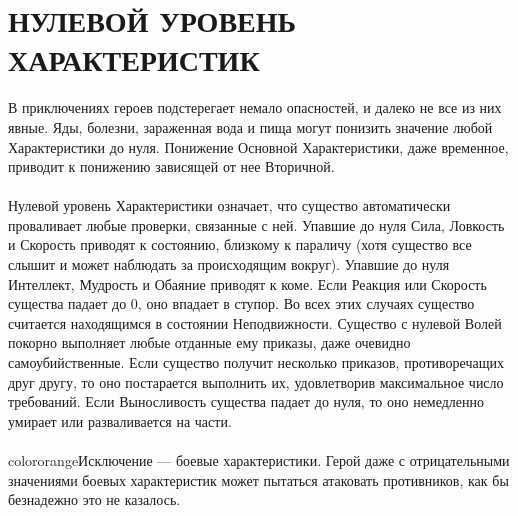 \section{НУЛЕВОЙ УРОВЕНЬ ХАРАКТЕРИСТИК}
В приключениях героев подстерегает немало опасностей, и далеко не все из них явные. Яды, болезни, зараженная вода и пища могут понизить значение любой Характеристики до нуля. Понижение Основной Характеристики, даже временное, приводит к понижению зависящей от нее Вторичной.
\paragraph{}
Нулевой уровень Характеристики означает, что существо автоматически проваливает любые проверки, связанные с ней. Упавшие до нуля Сила, Ловкость и Скорость приводят к состоянию, близкому к параличу (хотя существо все слышит и может наблюдать за происходящим вокруг). Упавшие до нуля Интеллект, Мудрость и Обаяние приводят к коме. Если Реакция или Скорость существа падает до 0, оно впадает в ступор. Во всех этих случаях существо считается находящимся в состоянии Неподвижности. Существо с нулевой Волей покорно выполняет любые отданные ему приказы, даже очевидно самоубийственные. Если существо получит несколько приказов, противоречащих друг другу, то оно постарается выполнить их, удовлетворив максимальное число требований. Если Выносливость существа падает до нуля, то оно немедленно умирает или разваливается на части.
\paragraph{}
{color{orange}Исключение — боевые характеристики. Герой даже с отрицательными значениями боевых характеристик может пытаться атаковать противников, как бы безнадежно это не казалось.}